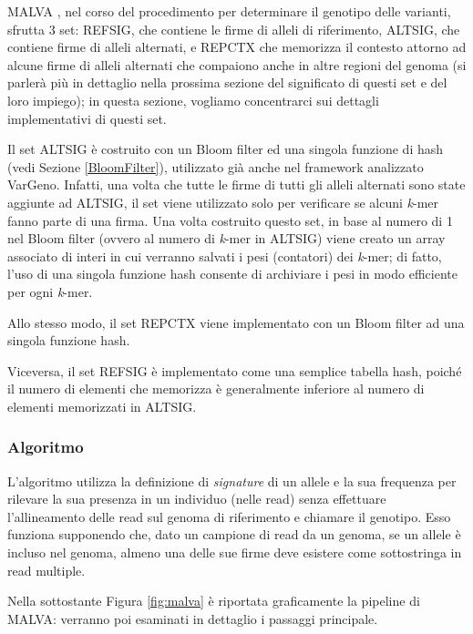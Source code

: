 \documentclass[../main.tex]{subfiles}
\begin{document}
MALVA , nel corso del procedimento per determinare il genotipo delle varianti, sfrutta 3 set: REFSIG, che contiene le firme di alleli di riferimento, ALTSIG, che contiene firme di alleli alternati, e REPCTX che memorizza il contesto attorno ad alcune firme di alleli alternati che compaiono anche in altre regioni del genoma (si parlerà più in dettaglio nella prossima sezione del significato di questi set e del loro impiego); in questa sezione, vogliamo concentrarci sui dettagli implementativi di questi set.

Il set ALTSIG è costruito con un Bloom filter ed una singola funzione di hash (vedi Sezione \ref{BloomFilter}), utilizzato già anche nel framework analizzato VarGeno. Infatti, una volta che tutte le firme di tutti gli alleli alternati sono state aggiunte ad ALTSIG, il set viene utilizzato solo per verificare se alcuni \textit{k}-mer fanno parte di una firma. Una volta costruito questo set, in base al numero di 1 nel Bloom filter (ovvero al numero di \textit{k}-mer in ALTSIG) viene creato un array associato di interi in cui verranno salvati i pesi (contatori) dei \textit{k}-mer; di fatto, l'uso di una singola funzione hash consente di archiviare i pesi in modo efficiente per ogni \textit{k}-mer.
 
Allo stesso modo, il set REPCTX viene implementato con un Bloom filter ad una singola funzione hash. 

Viceversa, il set REFSIG è implementato come una semplice tabella hash, poiché il numero di elementi che memorizza è generalmente inferiore al numero di elementi memorizzati in ALTSIG. 


\subsubsection{Algoritmo}

L'algoritmo utilizza la definizione di \textit{signature} di un allele e la sua frequenza per rilevare la sua presenza in un individuo (nelle read) senza effettuare l'allineamento delle read sul genoma di riferimento e chiamare il genotipo. Esso funziona supponendo che, dato un campione di read da un genoma, se un allele è incluso nel genoma, almeno una delle sue firme deve esistere come sottostringa in read multiple.

Nella sottostante Figura \ref{fig:malva} è riportata graficamente la pipeline di MALVA: verranno poi esaminati in dettaglio i passaggi principale.
\end{document}
